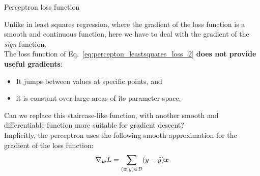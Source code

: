 \begin{frame}[t]{Perceptron loss function}


    Unlike in \gls{least squares} \gls{regression},
    where the gradient of the \gls{loss function} is a smooth and continuous function, 
    here we have to deal with the gradient of the {\em sign} function. \\
    \vspace{0.3cm}
    The \gls{loss function} of Eq.~\ref{eq:percepton_leastsquares_loss_2}
    {\bf does not provide useful gradients}:\\ 
    \begin{itemize}
        \item It jumps between values at specific points, and
        \item it is constant over large areas of its parameter space.\\
    \end{itemize}
    \vspace{0.3cm}
    Can we replace this staircase-like function, 
    with another smooth and differentiable function 
    more suitable for \gls{gradient descent}?\\
    \vspace{0.3cm}
    Implicitly, the \gls{perceptron} 
    uses the following smooth approximation for the gradient of the 
    \gls{loss function}: 
    \begin{equation}
        \nabla_{\boldsymbol{w}} L = 
          \sum_{(\boldsymbol{x},y) \in \mathcal{D}} 
          (y - \hat{y}) \boldsymbol{x}
    \label{eq:percepton_smooth_loss_1}  
    \end{equation}

\end{frame}

%
%
%

